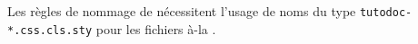 \begin{tdoctech}
    \item Les règles de nommage de \ctan nécessitent l'usage de noms du type \verb+tutodoc-*.css.cls.sty+ pour les fichiers à-la .
\end{tdoctech}
